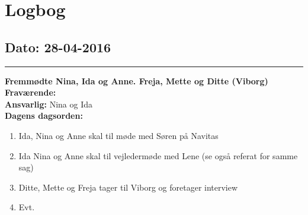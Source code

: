 \chapter{Logbog}
\section{Dato: 28-04-2016}
\hrule
\textbf{Fremmødte Nina, Ida og Anne. Freja, Mette og Ditte (Viborg)} \\
\textbf{Fraværende: } \\
\textbf{Ansvarlig:} Nina og Ida  \\
\textbf{Dagens dagsorden: }
\begin{enumerate}
	\item Ida, Nina og Anne skal til møde med Søren på Navitas
	\item Ida Nina og Anne skal til vejledermøde med Lene (se også referat for samme sag)
	\item Ditte, Mette og Freja tager til Viborg og foretager interview
	\item Evt. 
\end{enumerate}

